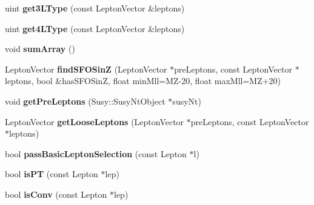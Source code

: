 \begin{DoxyCompactItemize}
\item 
\hypertarget{classSusySelection_a8ed69832598b39aa8e19f7ac36cbba43}{
uint {\bfseries get3LType} (const LeptonVector \&leptons)}
\label{classSusySelection_a8ed69832598b39aa8e19f7ac36cbba43}

\item 
\hypertarget{classSusySelection_ae758ee64fd51ff18ef4f22a82bbc6ec3}{
uint {\bfseries get4LType} (const LeptonVector \&leptons)}
\label{classSusySelection_ae758ee64fd51ff18ef4f22a82bbc6ec3}

\item 
\hypertarget{classSusySelection_aa9f63f4c8b3ef285fa0afcc988d3d141}{
void {\bfseries sumArray} ()}
\label{classSusySelection_aa9f63f4c8b3ef285fa0afcc988d3d141}

\item 
\hypertarget{classSusySelection_a7cb47f3c518e3ec7e10a7eff588ed943}{
LeptonVector {\bfseries findSFOSinZ} (LeptonVector $\ast$preLeptons, const LeptonVector $\ast$leptons, bool \&hasSFOSinZ, float minMll=MZ-\/20, float maxMll=MZ+20)}
\label{classSusySelection_a7cb47f3c518e3ec7e10a7eff588ed943}

\item 
\hypertarget{classSusySelection_a983d450d050c161439b0f1700d3a36cb}{
void {\bfseries getPreLeptons} (Susy::SusyNtObject $\ast$susyNt)}
\label{classSusySelection_a983d450d050c161439b0f1700d3a36cb}

\item 
\hypertarget{classSusySelection_a3591c1d69a2e120dd1c09e7187d69bc1}{
LeptonVector {\bfseries getLooseLeptons} (LeptonVector $\ast$preLeptons, const LeptonVector $\ast$leptons)}
\label{classSusySelection_a3591c1d69a2e120dd1c09e7187d69bc1}

\item 
\hypertarget{classSusySelection_a99b865915fecaf39af45b9aae76bc952}{
bool {\bfseries passBasicLeptonSelection} (const Lepton $\ast$l)}
\label{classSusySelection_a99b865915fecaf39af45b9aae76bc952}

\item 
\hypertarget{classSusySelection_acc7a9ae01cf1940c0c810f75e6a3b4a8}{
bool {\bfseries isPT} (const Lepton $\ast$lep)}
\label{classSusySelection_acc7a9ae01cf1940c0c810f75e6a3b4a8}

\item 
\hypertarget{classSusySelection_a81688a94ef2a63e95ac61fd2be607a74}{
bool {\bfseries isConv} (const Lepton $\ast$lep)}
\label{classSusySelection_a81688a94ef2a63e95ac61fd2be607a74}


\end{DoxyCompactItemize}
